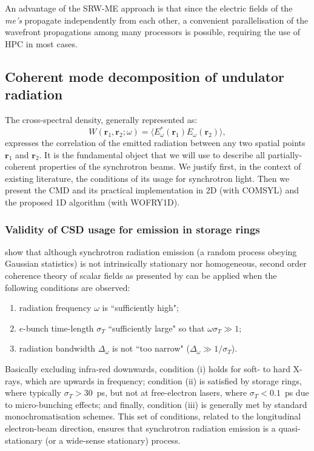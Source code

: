 \documentclass{iucr}              %
\begin{document}
An advantage of the SRW-ME approach is that since the electric fields of the \textit{me's} propagate independently from each other, a convenient parallelisation of the wavefront propagations among many processors is possible, requiring the use of HPC in most cases.
\subsection{Coherent mode decomposition of undulator radiation}\label{sec:CMD}

The cross-spectral density, generally represented as:
\begin{equation}
W(\textbf{r}_1,\textbf{r}_2;\omega) = \big\langle E^*_{\omega}(\textbf{r}_1)  E_{\omega}(\textbf{r}_2)\big\rangle,
\label{eq:CSD_2D}
\end{equation}
expresses the correlation of the emitted radiation between any two spatial points $\textbf{r}_1$ and $\textbf{r}_2$. It is the fundamental object that we will use to describe all partially-coherent properties of the synchrotron beams. We justify first, in the context of existing literature, the conditions of its usage for synchrotron light. Then we present the CMD and its practical implementation in 2D (with COMSYL) and the proposed 1D algorithm (with WOFRY1D).


\subsubsection{Validity of CSD usage for emission in storage rings\\}\label{sec:validity}

 show that although synchrotron radiation emission (a random process obeying Gaussian statistics) is not intrinsically stationary nor homogeneous, second order coherence theory of scalar fields as presented by  can be applied when the following conditions are observed:
\begin{enumerate}%
\item radiation frequency $\omega$ is ``sufficiently high";
\item $e$-bunch time-length $\sigma_{T}$ ``sufficiently large" so that $\omega\sigma_{T}\gg1$;
\item radiation bandwidth $\Delta_\omega$ is not ``too narrow" ($\Delta_\omega\gg1\big/\sigma_{T}$).
\end{enumerate}
Basically excluding infra-red downwards, condition (i) holds for soft- to hard X-rays, which are upwards in frequency; condition (ii) is satisfied by storage rings, where typically $\sigma_{T}>30$~ps, but not at free-electron lasers, where $\sigma_{T}<0.1$~ps due to micro-bunching effects; and finally, condition (iii) is generally met by standard monochromatisation schemes. This set of conditions, related to the longitudinal electron-beam direction, ensures that synchrotron radiation emission is a quasi-stationary (or a wide-sense stationary) process. 
\end{document}
